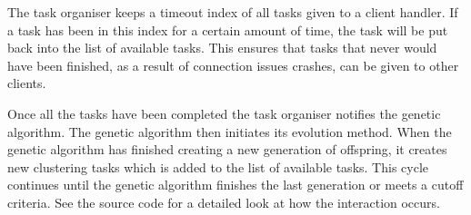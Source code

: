The task organiser keeps a timeout index of all tasks given to a client handler. If a task has been in this index for a certain amount of time, the task will be put back into the list of available tasks. This ensures that tasks that never would have been finished, as a result of connection issues crashes, can be given to other clients.

Once all the tasks have been completed the task organiser notifies the genetic algorithm. The genetic algorithm then initiates its evolution method. When the genetic algorithm has finished creating a new generation of offspring, it creates new clustering tasks which is added to the list of available tasks. This cycle continues until the genetic algorithm finishes the last generation or meets a cutoff criteria. See the source code for a detailed look at how the interaction occurs.
